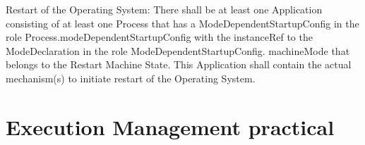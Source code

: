 \begin{DoxyItemize}
\begin{DoxyItemize}
\begin{DoxyItemize}
\begin{DoxyItemize}
\begin{DoxyItemize}
\item Restart of the Operating System\+: There shall be at least one Application consisting of at least one Process that has a Mode\+Dependent\+Startup\+Config in the role Process.\+mode\+Dependent\+Startup\+Config with the instance\+Ref to the Mode\+Declaration in the role Mode\+Dependent\+Startup\+Config. machine\+Mode that belongs to the Restart Machine State. This Application shall contain the actual mechanism(s) to initiate restart of the Operating System. 
\end{DoxyItemize}
\end{DoxyItemize}
\end{DoxyItemize}
\end{DoxyItemize}
\end{DoxyItemize}\hypertarget{Execution_practical}{}\section{Execution Management practical}\label{Execution_practical}
